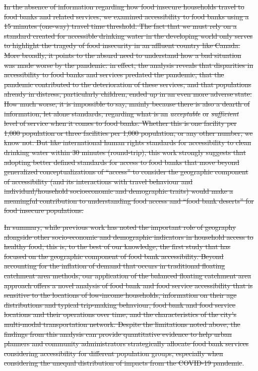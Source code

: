 \documentclass[]{elsarticle} %
\providecommand{\DIFaddtex}[1]{{\protect\color{blue}\uwave{#1}}} %
\providecommand{\DIFdeltex}[1]{{\protect\color{red}\sout{#1}}}                      %
\providecommand{\DIFaddbegin}{} %
\providecommand{\DIFaddend}{} %
\providecommand{\DIFdelend}{} %
\providecommand{\DIFadd}[1]{\texorpdfstring{\DIFaddtex{#1}}{#1}} %
\providecommand{\DIFdel}[1]{\texorpdfstring{\DIFdeltex{#1}}{}} %
\newcommand{\DIFaddincludegraphics}[2][]{{\color{blue}\fbox{\DIFOincludegraphics[#1]{#2}}}} %
\DeclareRobustCommand{\DIFaddbegin}{\DIFOaddbegin \let\includegraphics\DIFaddincludegraphics} %
\DeclareRobustCommand{\DIFaddend}{\DIFOaddend \let\includegraphics\DIFOincludegraphics} %
\DeclareRobustCommand{\DIFdelend}{\DIFOaddend \let\includegraphics\DIFOincludegraphics} %
\begin{document}
\DIFdel{In the absence of information regarding how food insecure households
travel to food banks and related services, we examined accessibility to
food banks using a 15 minutes (one-way) travel time threshold. The fact
that we must rely on a standard created for accessible drinking water in
the developing world only serves to highlight the tragedy of food
insecurity in an affluent country like Canada. More broadly, it points
to the absurd need to understand how a bad situation was made worse by
the pandemic: in effect, the analysis reveals that disparities in
accessibility to food banks and services predated the pandemic, that the
pandemic contributed to the deterioration of these services, and that
populations already in distress, particularly children, ended up in an
even more adverse state. How much worse, it is impossible to say, mainly
because there is also a dearth of information, let alone standards,
regarding what is an }\emph{\DIFdel{acceptable}} %
\DIFdel{or }\emph{\DIFdel{sufficient}} %
\DIFdel{level of
service when it comes to food banks. Whether this is one facility per
1,000 population or three facilities per 1,000 population, or any other
number, we know not. But like international human rights standards for
accessibility to clean drinking water within 30 minutes (round-trip),
this work strongly suggests that adopting better defined standards for
access to food banks that move beyond generalized conceptualizations of
``access'' to consider the geographic component of accessibility (and
its interactions with travel behaviour and individual/household
socioeconomic and demographic traits) would make a meaningful
contribution to understanding food access and ``food bank deserts'' for
food insecure populations.
}%

\DIFdel{In summary, while previous work has noted the important role of
geography alongside other socio-economic and demographic indicators in
household access to healthy food, this is, to the best of our knowledge,
the first study that has focused on the geographic component of food
bank accessibility. Beyond accounting for the inflation of demand that
occurs in traditional floating catchment area methods, our application
of the balanced floating catchment area approach offers a novel analysis
of food bank and food service accessibility that is sensitive to the
locations of low-income households, information on their age
distributions and typical trip-making behaviour, food bank and food
service locations and their operations over time, and the
characteristics of the city's multi-modal transportation network.
Despite the limitations noted above, the findings from this analysis can
provide quantitative evidence to help urban planners and community
administrators strategically allocate food bank services considering
accessibility for different population groups, especially when
considering the unequal distribution of impacts from the COVID-19
pandemic}\DIFdelend \DIFaddbegin \DIFadd{being the two
most impacted groups}\DIFaddend .
\end{document}

